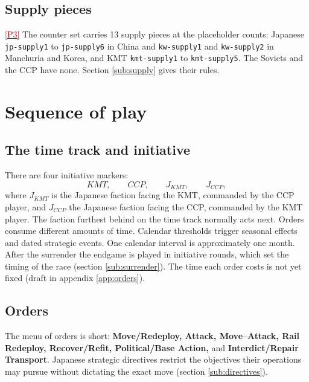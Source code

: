 \documentclass[11pt]{article}
\newcommand{\ptest}[1]{\hyperlink{ptest}{\textcolor{darkred}{[P#1]}}}
\begin{document}
\subsection{Supply pieces}\label{sub:supply-pieces}
\ptest{3} The counter set carries 13 supply pieces at the placeholder counts: Japanese \texttt{jp-supply1} to \texttt{jp-supply6} in China and \texttt{kw-supply1} and \texttt{kw-supply2} in Manchuria and Korea, and KMT \texttt{kmt-supply1} to \texttt{kmt-supply5}. The Soviets and the CCP have none. Section \ref{sub:supply} gives their rules.

\section{Sequence of play}\label{sec:sequence}
\subsection{The time track and initiative}\label{sub:timetrack}
There are four initiative markers:
\[
KMT,\qquad CCP,\qquad J_{KMT},\qquad J_{CCP},
\]
where $J_{KMT}$ is the Japanese faction facing the KMT, commanded by the CCP player, and $J_{CCP}$ the Japanese faction facing the CCP, commanded by the KMT player. The faction furthest behind on the time track normally acts next. Orders consume different amounts of time. Calendar thresholds trigger seasonal effects and dated strategic events. One calendar interval is approximately one month. After the surrender the endgame is played in initiative rounds, which set the timing of the race (section \ref{sub:surrender}). The time each order costs is not yet fixed (draft in appendix \ref{app:orders}).

\subsection{Orders}\label{sub:orders}
The menu of orders is short: \textbf{Move/Redeploy, Attack, Move--Attack, Rail Redeploy, Recover/Refit, Political/Base Action,} and \textbf{Interdict/Repair Transport}. Japanese strategic directives restrict the objectives their operations may pursue without dictating the exact move (section \ref{sub:directives}).
\end{document}
